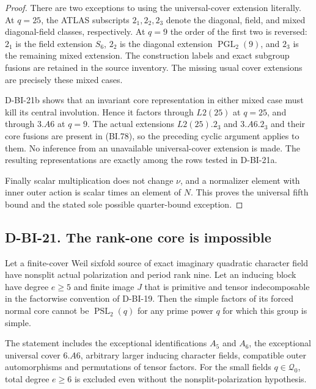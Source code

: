 \begin{proof}
There are two exceptions to using the universal-cover extension
literally.  At $q=25$, the ATLAS subscripts $2_1,2_2,2_3$ denote
the diagonal, field, and mixed diagonal-field classes, respectively.
At $q=9$ the order of the first two is reversed: $2_1$ is the
field extension $S_6$, $2_2$ is the diagonal extension
$\operatorname{PGL}_2(9)$, and $2_3$ is the remaining mixed
extension.  The construction labels and exact subgroup fusions
are retained in the source inventory.  The missing usual cover
extensions are precisely these mixed cases.

D-BI-21b shows that an invariant core representation in either
mixed case must kill its central involution.  Hence it factors
through $L2(25)$ at $q=25$, and through $3.A6$ at $q=9$.
The actual extensions $L2(25).2_3$ and $3.A6.2_3$ and their
core fusions are present in (BI.78), so the preceding cyclic
argument applies to them.  No inference from an unavailable
universal-cover extension is made.  The resulting representations
are exactly among the rows tested in D-BI-21a.

Finally scalar multiplication does not change $\nu$, and a
normalizer element with inner outer action is scalar times an
element of $N$.  This proves the universal fifth bound and the
stated sole possible quarter-bound exception.
\end{proof}

\subsection*{D-BI-21. The rank-one core is impossible}

\begin{theorem}
\label{D-BI-21}
Let a finite-cover Weil sixfold source of exact imaginary
quadratic character field have nonsplit actual polarization and
period rank nine.  Let an inducing block have degree $e\ge5$
and finite image $J$ that is primitive and tensor indecomposable
in the factorwise convention of D-BI-19.  Then the simple factors
of its forced normal core cannot be $\operatorname{PSL}_2(q)$
for any prime power $q$ for which this group is simple.

The statement includes the exceptional identifications $A_5$ and
$A_6$, the exceptional universal cover $6.A6$, arbitrary larger
inducing character fields, compatible outer automorphisms and
permutations of tensor factors.  For the small fields
$q\in\mathcal Q_0$, total degree $e\ge6$ is excluded even
without the nonsplit-polarization hypothesis.
\end{theorem}


